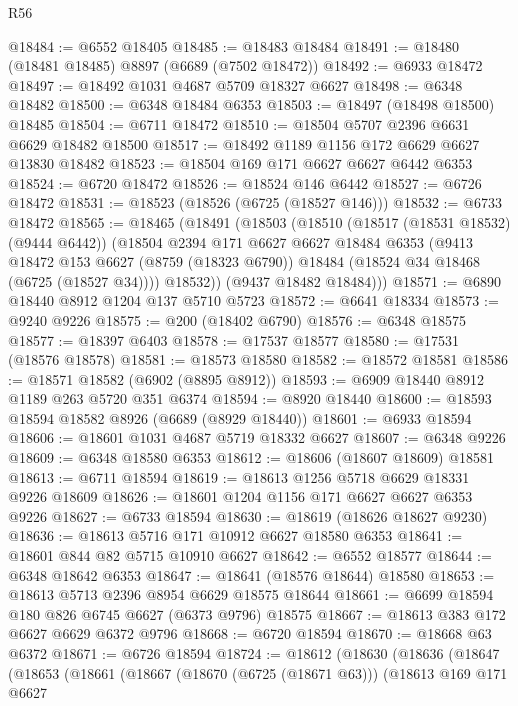 \begin{lexlean}{R56}
\begin{coremodule}
@18484 := @6552 @18405
@18485 := @18483 @18484
@18491 := @18480 (@18481 @18485) @8897 (@6689 (@7502 @18472))
@18492 := @6933 @18472
@18497 := @18492 @1031 @4687 @5709 @18327 @6627
@18498 := @6348 @18482
@18500 := @6348 @18484 @6353
@18503 := @18497 (@18498 @18500) @18485
@18504 := @6711 @18472
@18510 := @18504 @5707 @2396 @6631 @6629 @18482 @18500
@18517 := @18492 @1189 @1156 @172 @6629 @6627 @13830 @18482
@18523 := @18504 @169 @171 @6627 @6627 @6442 @6353
@18524 := @6720 @18472
@18526 := @18524 @146 @6442
@18527 := @6726 @18472
@18531 := @18523 (@18526 (@6725 (@18527 @146)))
@18532 := @6733 @18472
@18565 := @18465
    (@18491
      (@18503
        (@18510
          (@18517 (@18531 @18532) (@9444 @6442))
          (@18504
            @2394
            @171
            @6627
            @6627
            @18484
            @6353
            (@9413
              @18472
              @153
              @6627
              (@8759 (@18323 @6790))
              @18484
              (@18524 @34 @18468 (@6725 (@18527 @34))))
            @18532))
        (@9437 @18482 @18484)))
@18571 := @6890 @18440 @8912 @1204 @137 @5710 @5723
@18572 := @6641 @18334
@18573 := @9240 @9226
@18575 := @200 (@18402 @6790)
@18576 := @6348 @18575
@18577 := @18397 @6403
@18578 := @17537 @18577
@18580 := @17531 (@18576 @18578)
@18581 := @18573 @18580
@18582 := @18572 @18581
@18586 := @18571 @18582 (@6902 (@8895 @8912))
@18593 := @6909 @18440 @8912 @1189 @263 @5720 @351 @6374
@18594 := @8920 @18440
@18600 := @18593 @18594 @18582 @8926 (@6689 (@8929 @18440))
@18601 := @6933 @18594
@18606 := @18601 @1031 @4687 @5719 @18332 @6627
@18607 := @6348 @9226
@18609 := @6348 @18580 @6353
@18612 := @18606 (@18607 @18609) @18581
@18613 := @6711 @18594
@18619 := @18613 @1256 @5718 @6629 @18331 @9226 @18609
@18626 := @18601 @1204 @1156 @171 @6627 @6627 @6353 @9226
@18627 := @6733 @18594
@18630 := @18619 (@18626 @18627 @9230)
@18636 := @18613 @5716 @171 @10912 @6627 @18580 @6353
@18641 := @18601 @844 @82 @5715 @10910 @6627
@18642 := @6552 @18577
@18644 := @6348 @18642 @6353
@18647 := @18641 (@18576 @18644) @18580
@18653 := @18613 @5713 @2396 @8954 @6629 @18575 @18644
@18661 := @6699 @18594 @180 @826 @6745 @6627 (@6373 @9796) @18575
@18667 := @18613 @383 @172 @6627 @6629 @6372 @9796
@18668 := @6720 @18594
@18670 := @18668 @63 @6372
@18671 := @6726 @18594
@18724 := @18612
    (@18630
      (@18636
        (@18647
          (@18653
            (@18661
              (@18667
                (@18670 (@6725 (@18671 @63)))
                (@18613
                  @169
                  @171
                  @6627

\end{coremodule}
\end{lexlean}
